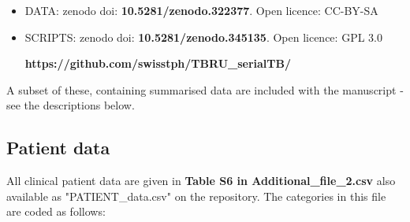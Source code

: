 \documentclass[12pt, oneside]{article}   	%
\begin{document}
\begin{itemize}
  \item DATA: zenodo doi: \textbf{10.5281/zenodo.322377}. Open licence: CC-BY-SA
  \item SCRIPTS: zenodo doi: \textbf{10.5281/zenodo.345135}. Open licence: GPL 3.0

  \textbf{https://github.com/swisstph/TBRU\_serialTB/}
\end{itemize}

\noindent A subset of these, containing summarised data are included with the manuscript - see the descriptions below.

\subsection{Patient data}
All clinical patient data are given in \textbf{Table S6 in Additional\_file\_2.csv} also available as "PATIENT\_data.csv" on the repository.
The categories in this file are coded as follows:
\end{document}
